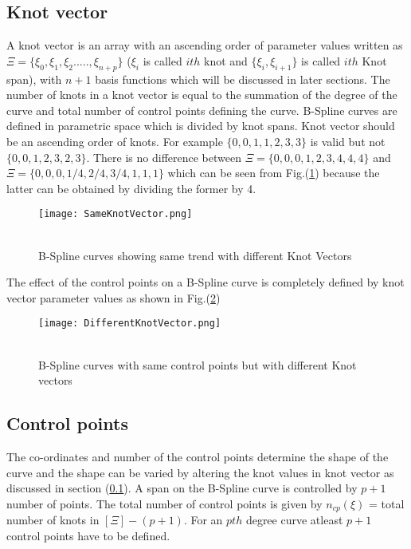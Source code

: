 \documentclass[11pt]{article}
\begin{document}
\subsection{Knot vector } \label{KnotVectorSection}
A knot vector is an array with an ascending order of parameter values written as
$\Xi = \{ \xi_0,\xi_1,\xi_2.....,\xi_{n+p}\}$
($\xi_i$ is called $ith$ knot and $\{\xi_i,\xi_{i+1}\}$ is called $ith$ Knot span), with $n+1$ basis functions which will be discussed in later sections.
The number of knots in a knot vector is equal to the summation of the degree of the curve and total number of control points defining the curve. 
B-Spline curves are defined in parametric space which is divided by knot spans. 
Knot vector should be an ascending order of knots. For example $\{0,0,1,1,2,3,3\}$ is valid but not $\{0,0,1,2,3,2,3\}$.
There is no difference between $\Xi = \{0,0,0,1,2,3,4,4,4\}$ and $\Xi = \{0,0,0,1/4,2/4,3/4,1,1,1\}$ which can be seen from Fig.(\ref{SameKnotVector}) because the latter can be obtained by dividing the former by 4.
\begin{figure}[H]
	\begin{center}
		\texttt{[image: SameKnotVector.png]} 
		\caption{\\B-Spline curves showing same trend with different Knot Vectors}\label{SameKnotVector}
	\end{center}	
\end{figure}
The effect of the control points on a B-Spline curve is completely defined by knot vector parameter values as shown in Fig.(\ref{DifferentKnotVector})
\begin{figure}[H]
	\begin{center}
		\texttt{[image: DifferentKnotVector.png]} 
		\caption{\\B-Spline curves with same control points but with different Knot vectors}\label{DifferentKnotVector}
	\end{center}	
\end{figure}

\subsection{Control points }
The co-ordinates and number of the control points determine the shape of the curve and the shape can be varied by altering the knot values in knot vector as discussed in section (\ref{KnotVectorSection}).
A span on the B-Spline curve is controlled by $p+1$ number of points.
The total
number of control points is given by $n_{cp}(\xi)$ = total number of knots in
$[\Xi] - (p+1)$. For an $pth$ degree curve atleast $p+1$ control points have to be defined.  
\end{document}
